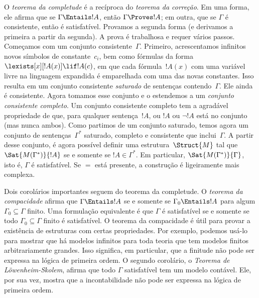 O \emph{teorema da completude} é a recíproca do \emph{teorema da
  correção}. Em uma forma, ele afirma que se $\Gamma \Entails !A$, então
$\Gamma \Proves !A$; em outra, que se $\Gamma$ é consistente, então
é satisfatível. Provamos a segunda forma (e derivamos a primeira a partir
da segunda). A prova é trabalhosa e requer vários passos.
Começamos com um conjunto consistente~$\Gamma$. Primeiro, acrescentamos
infinitos novos símbolos de constante~$c_i$, bem como fórmulas da forma
$\lexists[x][!A(x)] \lif !A(c)$, em que cada fórmula~$!A(x)$ com uma
variável livre na linguagem expandida é emparelhada com uma das novas
constantes. Isso resulta em um conjunto consistente \emph{saturado} de
sentenças contendo~$\Gamma$. Ele ainda é consistente. Agora tomamos
esse conjunto e o estendemos a um \emph{conjunto consistente completo}. Um
conjunto consistente completo tem a agradável propriedade de que, para qualquer
sentença~$!A$, ou $!A$ ou $\lnot !A$ está no conjunto (mas nunca
ambos). Como partimos de um conjunto saturado, temos agora um conjunto de
sentenças~$\Gamma^*$ saturado, completo e consistente que
inclui~$\Gamma$. A partir desse conjunto, é agora possível definir uma
estrutura~$\Struct{M}$ tal que $\Sat{M(\Gamma^*)}{!A}$ se e somente se
$!A \in \Gamma^*$. Em particular, $\Sat{M(\Gamma^*)}{\Gamma}$, isto é,
$\Gamma$ é satisfatível. Se $=$ está presente, a construção é
ligeiramente mais complexa.

Dois corolários importantes seguem do teorema da completude. O
\emph{teorema da compacidade} afirma que $\Gamma \Entails !A$ se e somente se
$\Gamma_0 \Entails !A$ para algum $\Gamma_0 \subseteq \Gamma$ finito. Uma
formulação equivalente é que $\Gamma$ é satisfatível se e somente se todo
$\Gamma_0 \subseteq \Gamma$ finito é satisfatível. O teorema da compacidade
é útil para provar a existência de estruturas com certas
propriedades. Por exemplo, podemos usá-lo para mostrar que há
modelos infinitos para toda teoria que tem modelos finitos
arbitrariamente grandes. Isso significa, em particular, que a finitude não
pode ser expressa na lógica de primeira ordem. O segundo corolário, o
\emph{Teorema de L\"owenheim-Skolem}, afirma que todo $\Gamma$ satisfatível
tem um modelo contável. Ele, por sua vez, mostra que a incontabilidade não
pode ser expressa na lógica de primeira ordem.

